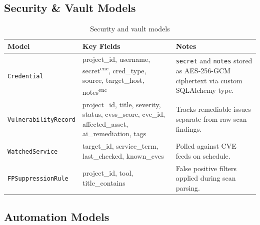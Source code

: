 \documentclass[11pt,a4paper,twoside,openright]{book}
\begin{document}
\subsection{Security \& Vault Models}

\begin{table}[H]
\centering
\begin{tabularx}{\textwidth}{L{3cm} L{4.5cm} X}
\toprule
\textbf{Model} & \textbf{Key Fields} & \textbf{Notes} \\
\midrule
\texttt{Credential}         & project\_id, username, secret\textsuperscript{enc}, cred\_type, source, target\_host, notes\textsuperscript{enc} & \texttt{secret} and \texttt{notes} stored as AES-256-GCM ciphertext via custom SQLAlchemy type. \\
\texttt{VulnerabilityRecord}& project\_id, title, severity, status, cvss\_score, cve\_id, affected\_asset, ai\_remediation, tags & Tracks remediable issues separate from raw scan findings. \\
\texttt{WatchedService}     & target\_id, service\_term, last\_checked, known\_cves & Polled against CVE feeds on schedule. \\
\texttt{FPSuppressionRule}  & project\_id, tool, title\_contains & False positive filters applied during scan parsing. \\
\bottomrule
\end{tabularx}
\caption{Security and vault models}
\end{table}

\subsection{Automation Models}
\end{document}
